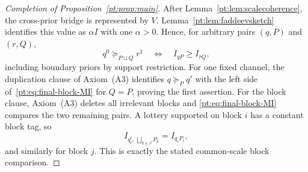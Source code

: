 \begin{proof}[Completion of Proposition~\ref{pt:prop:main}]
After Lemma~\ref{pt:lem:scalecoherence}, the cross-prior bridge is represented
by $V$.  Lemma~\ref{pt:lem:faddeevsketch} identifies this value as
$\alpha I$ with one $\alpha>0$.  Hence, for arbitrary pairs $(q,P)$ and
$(r,Q)$,
\[
 q^0\succeq_{P\sqcup Q}r^1
 \quad\Longleftrightarrow\quad
 I_{qP}\ge I_{rQ},
\tag{BMI}\label{pt:eq:final-block-MI}
\]
including boundary priors by support restriction.  For one fixed channel,
the duplication clause of Axiom~\textup{(A3)} identifies
$q\succeq_Pq'$ with the left side of~\eqref{pt:eq:final-block-MI} for
$Q=P$, proving the first assertion.  For the block clause,
Axiom~\textup{(A3)} deletes all irrelevant blocks and
\eqref{pt:eq:final-block-MI} compares the two remaining pairs.  A lottery
supported on block $i$ has a constant block tag, so
\[
 I_{q_i^i,\,\bigsqcup_{k\in J}P_k}
 =I_{q_iP_i},
\]
and similarly for block $j$.  This is exactly the stated common-scale block
comparison.
\end{proof}
